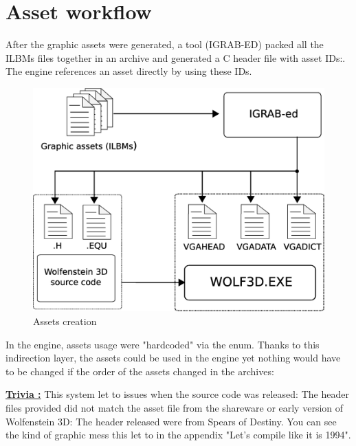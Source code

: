 \documentclass[book.tex]{subfiles}
\begin{document}
\section{Asset workflow}
After the graphic assets were generated, a tool (IGRAB-ED) packed all the ILBMs files together in an archive and generated a C header file with asset IDs:. The engine references an asset directly by using these IDs.\\
\begin{figure}[H]
\centering
 \includegraphics[width=\textwidth]{imgs/drawings/drawing_plain.eps}
 \caption{Assets creation} 
 \end{figure}

\begin{minipage}{\textwidth}
 \par
 \end{minipage}
 
 In the engine, assets usage were "hardcoded" via the enum. Thanks to this indirection layer, the assets could be used in the engine yet nothing would have to be changed if the order of the assets changed in the  archives:\\
 \par
 \begin{minipage}{\textwidth}
 \par
 \end{minipage}
\par
\textbf{\underline{Trivia :}} This system let to issues when the source code was released: The  header files provided did not match the asset file from the shareware or early version of Wolfenstein 3D: The header released were from Spears of Destiny. You can see the kind of graphic mess this let to in the appendix "Let's compile like it is 1994".\\
\end{document}
